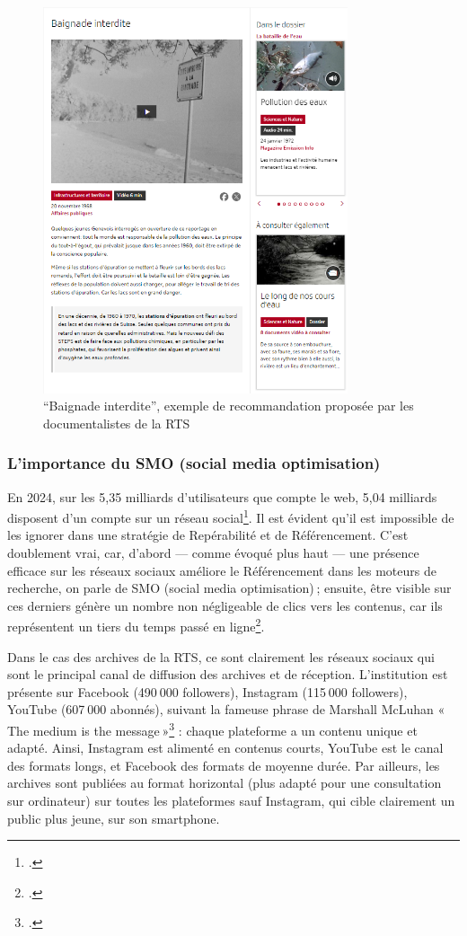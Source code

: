 \begin{figure}[h!]
	\centering
	\includegraphics[width=0.8\textwidth]{images/image8.png}
	\caption{\enquote{Baignade interdite}, exemple de recommandation proposée par les documentalistes de la RTS}
	\label{fig:image8}
\end{figure}


\subsubsection{L'importance du SMO (social media optimisation)}


En 2024, sur les 5,35 milliards d’utilisateurs que compte le web, 5,04 milliards disposent d’un compte sur un réseau social\footcite{zotero-229}. Il est évident qu’il est impossible de les ignorer dans une stratégie de Repérabilité et de Référencement. C’est doublement vrai, car, d’abord — comme évoqué plus haut — une présence efficace sur les réseaux sociaux améliore le Référencement dans les moteurs de recherche, on parle de SMO (social media optimisation) ; ensuite, être visible sur ces derniers génère un nombre non négligeable de clics vers les contenus, car ils représentent un tiers du temps passé en ligne\footcite{zotero-227}.

Dans le cas des archives de la RTS, ce sont clairement les réseaux sociaux qui sont le principal canal de diffusion des archives et de réception. L’institution est présente sur Facebook (490 000 followers), Instagram (115 000 followers), YouTube (607 000 abonnés), suivant la fameuse phrase de Marshall McLuhan « The medium is the message »\footcite{zotero-226} : chaque plateforme a un contenu unique et adapté. Ainsi, Instagram est alimenté en contenus courts, YouTube est le canal des formats longs, et Facebook des formats de moyenne durée. Par ailleurs, les archives sont publiées au format horizontal (plus adapté pour une consultation sur ordinateur) sur toutes les plateformes sauf Instagram, qui cible clairement un public plus jeune, sur son smartphone.


